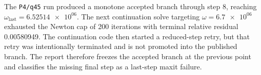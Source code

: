 The \texttt{P4/q45} run produced a monotone accepted branch through step 8, reaching \(\omega_{\mathrm{last}} = \num{6.52514e+06}\). The next continuation solve targeting \(\omega = \num{6.7e+06}\) exhausted the Newton cap of 200 iterations with terminal relative residual \num{0.00580949}. The continuation code then started a reduced-step retry, but that retry was intentionally terminated and is not promoted into the published branch. The report therefore freezes the accepted branch at the previous point and classifies the missing final step as a last-step maxit failure.
